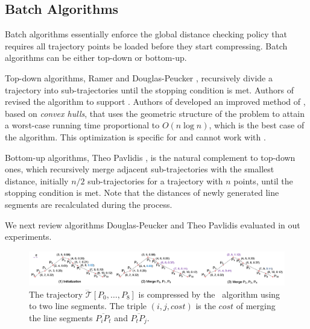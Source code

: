 \subsection{Batch Algorithms}

Batch algorithms essentially enforce the global distance checking policy that requires all trajectory points be loaded before they start compressing. %
Batch algorithms can be either top-down or bottom-up.

Top-down algorithms, \eg Ramer \cite{Ramer:Split} and Douglas-Peucker \cite{Douglas:Peucker}, recursively divide a trajectory into sub-trajectories until the stopping condition is met.
Authors of \cite{Meratnia:Spatiotemporal} revised the \dpa algorithm to support \sed.
Authors of \cite{Hershberger:Speeding} developed an improved method of \dpa, based on \emph{convex hulls}, that uses the geometric structure of the problem to attain a worst-case running time proportional to $O(n\log n)$, which is the best case of the \dpa algorithm. {This optimization is specific for \ped and cannot work with \sed.}

Bottom-up algorithms, \eg Theo Pavlidis \cite{Pavlidis:Segment}, is the natural complement to top-down ones, which recursively merge adjacent sub-trajectories with the smallest distance, initially $n/2$  sub-trajectories for a trajectory with $n$ points, until the stopping condition is met. Note that the distances of newly generated line segments are recalculated during the process.

We next review algorithms Douglas-Peucker and Theo Pavlidis evaluated in out experiments.

\begin{figure}[tb!]
	\centering
	\includegraphics[scale=0.55]{figures/Fig-Pavlidis.png}
	\vspace{-5ex}
	\caption{\small The trajectory $\dddot{\mathcal{T}}[P_0, \ldots, P_{8}]$ is compressed by the \pavlidis~algorithm using \ped to two line segments. The triple $(i, j, cost)$ is the $cost$ of merging the line segments $\overline{P_iP_t}$ and $\overline{P_tP_j}$.} %
	\vspace{-2ex}
	\label{fig:pavlidis}
\end{figure}

